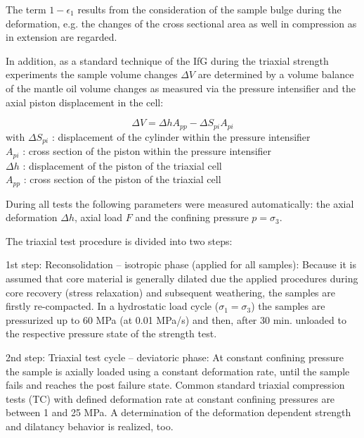 The term $1-\epsilon_1$ results from the consideration of the sample bulge during the deformation, e.g. the 
changes of the cross sectional area as well in compression as in extension are regarded.

In addition, as a standard technique of the IfG during the triaxial strength experiments the sample volume 
changes $\Delta V$ are determined by a volume balance of the mantle oil volume changes as measured via the 
pressure intensifier and the axial piston displacement in the cell:

\begin{equation}
\Delta V = \Delta h A_{pp} -\Delta S_{pi} A_{pi}
\end{equation}
with
$\Delta S_{pi}$ : displacement of the cylinder within the pressure intensifier \\
$A_{pi}$ : cross section of the piston within the pressure intensifier \\
$\Delta h$ : displacement of the piston of the triaxial cell \\
$A_{pp}$ : cross section of the piston of the triaxial cell 

During all tests the following parameters were measured automatically: the axial deformation $\Delta h$, axial load $F$ and the confining 
pressure $p = \sigma_3$. 

The triaxial test procedure is divided into two steps:

\begin{list}{-}{\leftmargin=1em \itemindent=0em \itemsep=0.2em}
\item 1st step: Reconsolidation – isotropic phase (applied for all samples): Because it is assumed that core material is generally dilated due the applied procedures during core recovery (stress relaxation) and subsequent weathering, the samples are firstly re-compacted. In a hydrostatic load cycle ($\sigma_1 = \sigma_3$) the samples are pressurized up to 60 MPa (at 0.01 MPa/s) and then, after 30 min. unloaded to the respective pressure state of the strength test.
\item 2nd step: Triaxial test cycle – deviatoric phase:  At constant confining pressure the sample is axially 
loaded using a constant deformation rate, until the sample fails and reaches the post failure state. Common 
standard triaxial compression tests (TC) with defined deformation rate at constant confining pressures 
are between 1 and 25 MPa. A determination of the deformation dependent strength and dilatancy behavior 
is realized, too.
\end{list}

